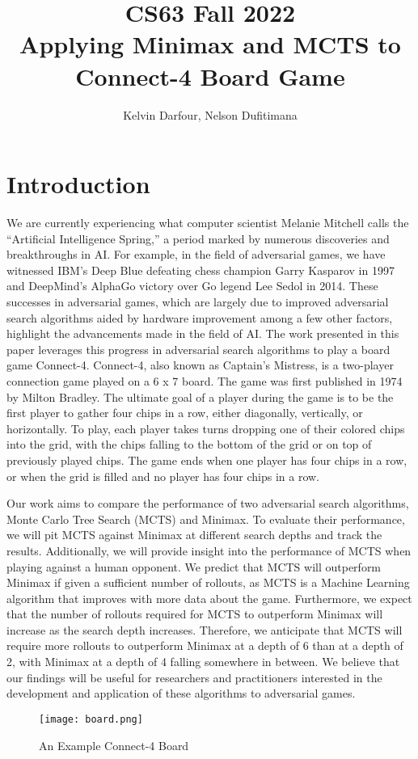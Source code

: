 \documentclass[11pt]{article}
\title{CS63 Fall 2022\\Applying Minimax and MCTS to Connect-4 Board Game}
\author{Kelvin Darfour, Nelson Dufitimana}
\date{}
\begin{document}
\maketitle

\section{Introduction}

We are currently experiencing what computer scientist Melanie Mitchell calls 
the ``Artificial Intelligence Spring,'' a period marked by numerous discoveries and breakthroughs in AI. 
For example, in the field of adversarial games, we have witnessed IBM's Deep Blue defeating chess 
champion Garry Kasparov in 1997 and DeepMind's AlphaGo victory over Go legend Lee Sedol in 2014. 
These successes in adversarial games, which are largely due to improved adversarial search algorithms aided by 
hardware improvement among a few other factors, highlight the advancements made in the field of AI. 
The work presented in this paper leverages this progress in adversarial search algorithms to play a board game Connect-4. 
Connect-4, also known as Captain's Mistress, is a two-player connection game 
played on a 6 x 7 board. The game was first published in 1974 by Milton Bradley. 
The ultimate goal of a player during the game is to be the first player to gather four chips in a row, 
either diagonally, vertically, or horizontally. To play, each player takes turns dropping one of their 
colored chips into the grid, with the chips falling to the bottom of the grid or on top of previously 
played chips. The game ends when one player has four chips in a row, or when the grid is filled and 
no player has four chips in a row. 

Our work aims to compare the performance of two adversarial search algorithms, Monte Carlo Tree Search (MCTS) 
and Minimax. To evaluate their performance, we will pit MCTS against Minimax at different search depths and 
track the results. Additionally, we will provide insight into the performance of MCTS when playing against 
a human opponent. We predict that MCTS will outperform Minimax if given a sufficient number of rollouts, 
as MCTS is a Machine Learning algorithm that improves with more data about the game. 
Furthermore, we expect that the number of rollouts required for MCTS to outperform Minimax will increase 
as the search depth increases. Therefore, we anticipate that MCTS will require more rollouts to outperform 
Minimax at a depth of 6 than at a depth of 2, with Minimax at a depth of 4 falling somewhere in between.
We believe that our findings will be useful for researchers and practitioners interested in the development 
and application of these algorithms to adversarial games.
\FloatBarrier
\begin{figure}[h]
    \begin{center}
      \texttt{[image: board.png]}
    \end{center}
    \caption{An Example Connect-4 Board}
    \label{Connect-4 Game}
  \end{figure}
\FloatBarrier
\end{document}
